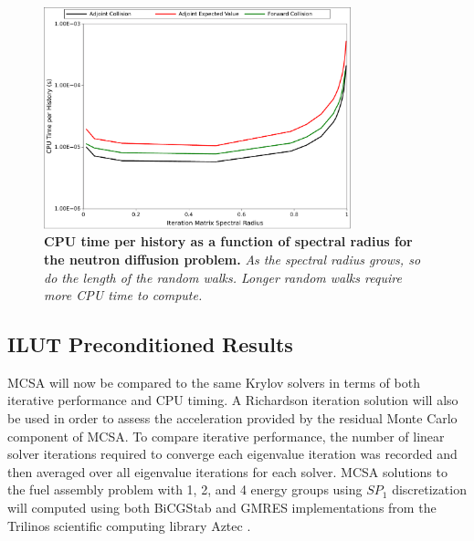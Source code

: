 \documentclass[letterpaper,11pt]{article}
\begin{document}
\begin{figure}[t!]
  \begin{center}
    \includegraphics[width=3.5in]{breakdown_time.pdf}
  \end{center}
  \caption{\textbf{CPU time per history as a function of spectral
      radius for the neutron diffusion problem.} \textit{As the
      spectral radius grows, so do the length of the random
      walks. Longer random walks require more CPU time to compute.}}
  \label{fig:breakdown_time}
\end{figure}

\subsection{ILUT Preconditioned Results}
\label{subsec:spn_comparison}
MCSA will now be compared to the same Krylov solvers in terms of both
iterative performance and CPU timing. A Richardson iteration solution
will also be used in order to assess the acceleration provided by the
residual Monte Carlo component of MCSA.  To compare iterative
performance, the number of linear solver iterations required to
converge each eigenvalue iteration was recorded and then averaged over
all eigenvalue iterations for each solver. MCSA solutions to the fuel
assembly problem with 1, 2, and 4 energy groups using $SP_1$
discretization will computed using both BiCGStab and GMRES
implementations from the Trilinos scientific computing library Aztec
\cite{heroux_overview_2005}.
\end{document}
